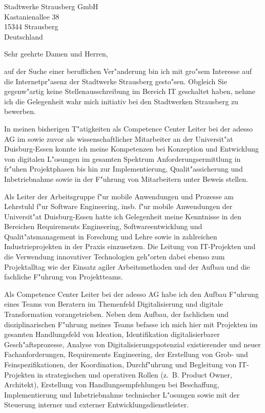 \documentclass[10pt,a4paper]{dinbrief}
\date{\today}
\begin{document}
 
\begin{letter}  
{%
	Stadtwerke Strausberg GmbH\\
	Kastanienallee 38\\
	15344 Strausberg\\
	Deutschland
}
\subject{\bf Initativbewerbung Experte Digitalisierung und IT}
\opening{Sehr geehrte Damen und Herren,}
auf der Suche einer beruflichen Ver"anderung bin ich mit gro"sem Interesse auf die Internetpr"asenz der Stadtwerke Strausberg gesto"sen. Obgleich Sie gegenw"artig keine Stellenausschreibung im Bereich IT geschaltet haben, nehme ich die Gelegenheit wahr mich initiativ bei den Stadtwerken Strausberg zu bewerben. 

In meinen bisherigen T"atigkeiten als Competence Center Leiter bei der adesso AG im sowie zuvor als wissenschaftlicher Mitarbeiter an der Universit"at Duisburg-Essen konnte ich meine Kompetenzen bei Konzeption und Entwicklung von digitalen L"osungen im gesamten Spektrum Anforderungsermittlung in fr"uhen Projektphasen bis hin zur Implementierung, Qualit"assicherung und Inbetriebnahme sowie in der F"uhrung von Mitarbeitern unter Beweis stellen.

Als Leiter der Arbeitsgruppe f"ur mobile Anwendungen und Prozesse am Lehrstuhl f"ur Software Engineering, insb. f"ur mobile Anwendungen der Universit"at Duisburg-Essen hatte ich Gelegenheit meine Kenntnisse in den Bereichen Requirements Engineering, Softwareentwicklung  und Qualit"atsmanagement in Forschung und Lehre sowie in zahlreichen Industrieprojekten in der Praxis einzusetzen. Die Leitung von IT-Projekten und die Verwendung innovativer Technologien geh"orten dabei ebenso zum Projektalltag wie der Einsatz agiler Arbeitsmethoden und der Aufbau und die fachliche  F"uhrung von Projektteams.

Als Competence Center Leiter bei der adesso AG habe ich den Aufbau F"uhrung eines Teams von Beratern im Themenfeld Digitalisierung und digitale Transformation vorangetrieben. Neben dem Aufbau, der fachlichen und disziplinarischen F"uhrung meines Teams befasse ich mich hier mit Projekten im gesamten Handlungsfeld von Ideation, Identifikation digitalisierbarer Gesch"aftsprozesse, Analyse von Digitalisierungspotenzial existierender und neuer Fachanforderungen, Requirements Engineering, der Erstellung von Grob- und Feinspezifikationen, der Koordination, Durchf"uhrung und Begleitung von IT-Projekten in strategischen und operativen Rollen (z.~B. Product Owner, Architekt), Erstellung von Handlungsempfehlungen bei Beschaffung, Implementierung und Inbetriebnahme technischer L"osungen sowie mit der Steuerung interner und externer Entwicklungsdienstleister.\clearpage


\end{letter}
\end{document}
